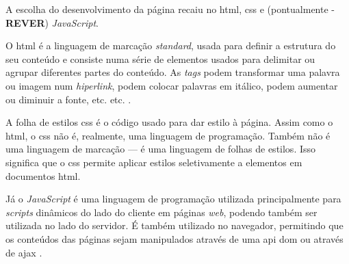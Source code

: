 A escolha do desenvolvimento da página recaiu no \acrshort{html}, \acrshort{css} e (pontualmente - \textbf{REVER}) \textit{JavaScript}.

O \acrshort{html} é a linguagem de marcação \textit{standard}, usada para definir a estrutura do seu conteúdo e consiste numa série de elementos usados para delimitar ou agrupar diferentes partes do conteúdo. As \textit{tags} podem transformar uma palavra ou imagem num \textit{hiperlink}, podem colocar palavras em itálico, podem aumentar ou diminuir a fonte, etc. etc. \cite{HTMLbasics}.

A folha de estilos \acrshort{css} é o código usado para dar estilo à página. Assim como o \acrshort{html}, o \acrshort{css} não é, realmente, uma linguagem de programação. Também não é uma linguagem de marcação — é uma linguagem de folhas de estilos. Isso significa que o \acrshort{css} permite aplicar estilos seletivamente a elementos em documentos \acrshort{html}.

Já o \textit{JavaScript} é uma linguagem de programação utilizada principalmente para \textit{scripts} dinâmicos do lado do cliente em páginas \textit{web}, podendo também ser utilizada no lado do servidor. É também utilizado no navegador, permitindo que os conteúdos das páginas sejam manipulados através de uma \acrshort{api} \acrfull{dom} ou através de \acrfull{ajax} \cite{HTMLbasics}.